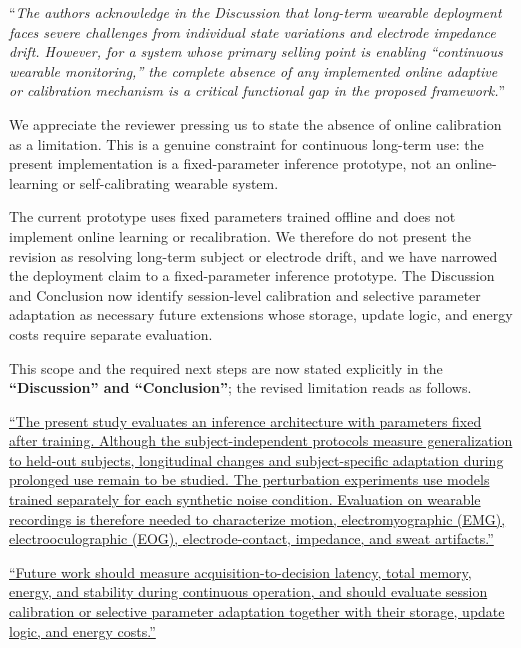 \documentclass[12pt,technote,onecolumn]{IEEEtran}
\begin{document}
``{\it The authors acknowledge in the Discussion that long-term wearable
deployment faces severe challenges from individual state variations and
electrode impedance drift. However, for a system whose primary selling
point is enabling ``continuous wearable monitoring,'' the complete
absence of any implemented online adaptive or calibration mechanism is a
critical functional gap in the proposed framework.}''
\vspace{1mm}


We appreciate the reviewer pressing us to state the absence of online calibration as a limitation. This is a genuine constraint for continuous long-term use: the present implementation is a fixed-parameter inference prototype, not an online-learning or self-calibrating wearable system.

The current prototype uses fixed parameters trained offline and does not
implement online learning or recalibration. We therefore do not present
the revision as resolving long-term subject or electrode drift, and we
have narrowed the deployment claim to a fixed-parameter inference
prototype. The Discussion and Conclusion now identify session-level
calibration and selective parameter adaptation as necessary future
extensions whose storage, update logic, and energy costs require
separate evaluation.

This scope and the required next steps are now stated explicitly in the \textbf{``Discussion'' and ``Conclusion''}; the revised limitation reads as follows.

\uline{``The present study evaluates an inference architecture with parameters fixed after training. Although the subject-independent protocols measure generalization to held-out subjects, longitudinal changes and subject-specific adaptation during prolonged use remain to be studied. The perturbation experiments use models trained separately for each synthetic noise condition. Evaluation on wearable recordings is therefore needed to characterize motion, electromyographic (EMG), electrooculographic (EOG), electrode-contact, impedance, and sweat artifacts.''}

\uline{``Future work should measure acquisition-to-decision latency, total memory, energy, and stability during continuous operation, and should evaluate session calibration or selective parameter adaptation together with their storage, update logic, and energy costs.''}

\vspace{4mm}
\end{document}
